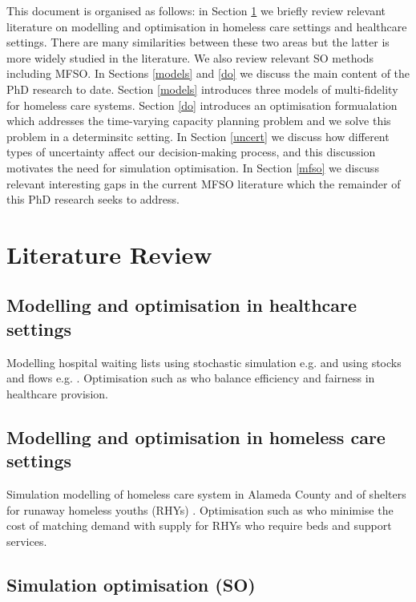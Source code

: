 \documentclass{article}
\begin{document}
This document is organised as follows: in Section \ref{lit-rev} we briefly review relevant literature on modelling and optimisation in homeless care settings and healthcare settings. There are many similarities between these two areas but the latter is more widely studied in the literature. We also review relevant SO methods including MFSO. In Sections \ref{models} and \ref{do} we discuss the main content of the PhD research to date. Section \ref{models} introduces three models of multi-fidelity for homeless care systems. Section \ref{do} introduces an optimisation formualation which addresses the time-varying capacity planning problem and we solve this problem in a determinsitc setting. In Section \ref{uncert} we discuss how different types of uncertainty affect our decision-making process, and this discussion motivates the need for simulation optimisation. In Section \ref{mfso} we discuss relevant interesting gaps in the current MFSO literature which the remainder of this PhD research seeks to address.

\section{Literature Review} \label{lit-rev}

\subsection{Modelling and optimisation in healthcare settings}

Modelling hospital waiting lists using stochastic simulation e.g. \cite{wood2022supporting} and using stocks and flows e.g. \cite{worthington1991hospital}. Optimisation such as \cite{argyris2022fair} who balance efficiency and fairness in healthcare provision. 

\subsection{Modelling and optimisation in homeless care settings}

Simulation modelling of homeless care system in Alameda County \citep{singham2023discrete} and of shelters for runaway homeless youths (RHYs) \citep{kaya2022discrete}. Optimisation such as \cite{kaya2022improving} who minimise the cost of matching demand with supply for RHYs who require beds and support services.

\subsection{Simulation optimisation (SO)}
\end{document}
